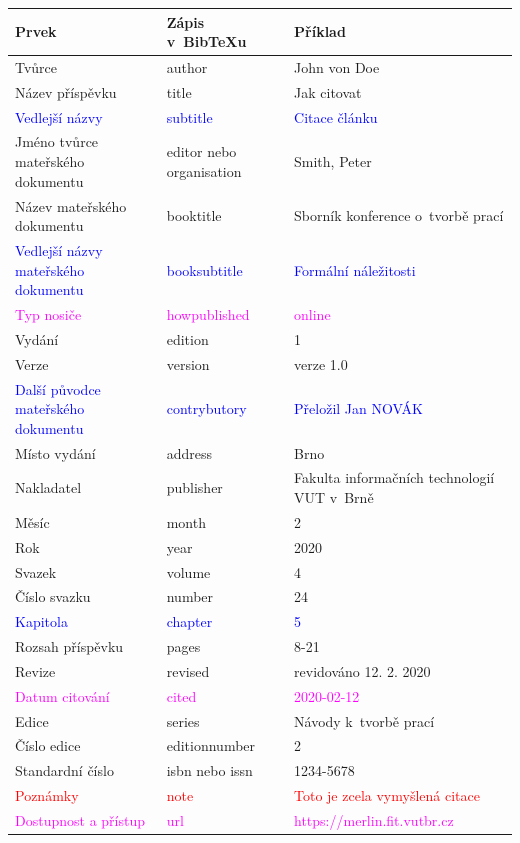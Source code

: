 \begin{tabularx}{\linewidth}{X X X}
    Prvek & Zápis v~BibTeXu & Příklad\\\hline
    Tvůrce & author & John von Doe\\
    Název příspěvku & title & Jak citovat\\
    \textcolor{blue}{Vedlejší názvy} & \textcolor{blue}{subtitle} & \textcolor{blue}{Citace článku}\\
    Jméno tvůrce mateřského dokumentu & editor nebo organisation & Smith, Peter\\
    Název mateřského dokumentu & booktitle & Sborník konference o~tvorbě prací\\
    \textcolor{blue}{Vedlejší názvy mateřského dokumentu} & \textcolor{blue}{booksubtitle} & \textcolor{blue}{Formální náležitosti}\\
    \textcolor{magenta}{Typ nosiče} & \textcolor{magenta}{howpublished} & \textcolor{magenta}{online}\\
    Vydání & edition & 1\\
    Verze & version & verze 1.0\\
    \textcolor{blue}{Další původce mateřského dokumentu} & \textcolor{blue}{contrybutory} & \textcolor{blue}{Přeložil Jan NOVÁK}\\
    Místo vydání & address & Brno\\
    Nakladatel & publisher & Fakulta informačních technologií VUT v~Brně\\
    Měsíc & month & 2\\
    Rok & year & 2020\\
    Svazek & volume & 4\\
    Číslo svazku & number & 24\\
    \textcolor{blue}{Kapitola} & \textcolor{blue}{chapter} & \textcolor{blue}{5}\\
    Rozsah příspěvku & pages & 8-21\\
    Revize & revised & revidováno 12. 2. 2020\\
    \textcolor{magenta}{Datum citování} & \textcolor{magenta}{cited} & \textcolor{magenta}{2020-02-12}\\
    Edice & series & Návody k~tvorbě prací\\
    Číslo edice & editionnumber & 2\\
    Standardní číslo & isbn nebo issn & 1234-5678\\
    \textcolor{red}{Poznámky} & \textcolor{red}{note} & \textcolor{red}{Toto je zcela vymyšlená citace}\\
    \textcolor{magenta}{Dostupnost a přístup} & \textcolor{magenta}{url} & \textcolor{magenta}{https://merlin.fit.vutbr.cz}\\
\end{tabularx}

